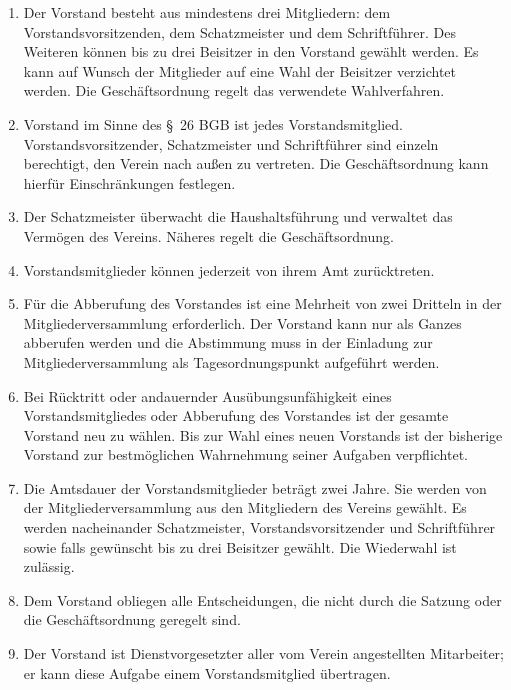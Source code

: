 \documentclass[10pt,a4paper]{scrartcl}
\begin{document}
\begin{enumerate}

    \item Der Vorstand besteht aus mindestens drei Mitgliedern: dem
    Vorstandsvorsitzenden, dem Schatzmeister und dem Schriftf{\"u}hrer. Des
    Weiteren k{\"o}nnen bis zu drei Beisitzer in den Vorstand gew{\"a}hlt werden. Es
    kann auf Wunsch der Mitglieder auf eine Wahl der Beisitzer verzichtet
    werden. Die Gesch{\"a}ftsordnung regelt das verwendete Wahlverfahren.
    \item Vorstand im Sinne des \S \ 26 BGB ist jedes Vorstandsmitglied.
    Vor\-stands\-vorsitzen\-der, Schatz\-meis\-ter und Schriftf{\"u}hrer sind einzeln
    berechtigt, den Verein nach au{\ss}en zu vertreten. Die Gesch{\"a}ftsordnung kann
    hierf{\"u}r Einschr{\"a}nkungen festlegen.
	\item Der Schatzmeister {\"u}ber\-wacht die Haushaltsf{\"u}hrung und verwaltet das
		Ver\-m{\"o}\-gen des Vereins. N{\"a}\-her\-es regelt die Ge\-sch{\"a}fts\-ord\-nung.
	\item Vorstandsmitglieder k{\"o}nnen jederzeit von ihrem Amt zur{\"u}cktreten.
        \item F{\"u}r die Abberufung des Vorstandes ist eine Mehrheit von zwei Dritteln in der Mitgliederversammlung erforderlich. Der Vorstand kann nur als Ganzes abberufen werden und die Abstimmung muss in der Einladung zur Mitgliederversammlung als Tagesordnungspunkt aufgef{\"u}hrt werden.
        \item Bei R{\"u}cktritt oder andauernder Aus{\"u}bungsunf{\"a}higkeit eines Vorstandsmitgliedes oder Abberufung
		des Vorstandes ist der gesamte Vorstand neu zu w{\"a}hlen. Bis zur Wahl eines neuen Vorstands ist der
		bisherige Vorstand zur bestm{\"o}glichen Wahrnehmung seiner Aufgaben verpflichtet.
    \item Die Amtsdauer der Vorstandsmitglieder betr{\"a}gt zwei Jahre. Sie werden
    von der Mit\-glieder\-ver\-sammlung aus den Mitgliedern des Vereins gew{\"a}hlt. Es
    werden nacheinander Schatz\-meister, Vorstands\-vorsitzen\-der und Schrift\-f{\"u}hrer
    sowie falls gew{\"u}nscht bis zu drei Beisitzer gew{\"a}hlt. Die Wiederwahl ist
    zul{\"a}ssig.
    \item Dem Vorstand obliegen alle Entschei\-dungen, die nicht durch die Satzung oder die Ge\-sch{\"a}fts\-ord\-nung geregelt sind.
	\item Der Vorstand ist Dienstvorgesetzter aller vom Verein angestellten Mitarbeiter;
		er kann diese Aufgabe einem Vorstandsmitglied {\"u}bertragen.

\end{enumerate}
\end{document}
